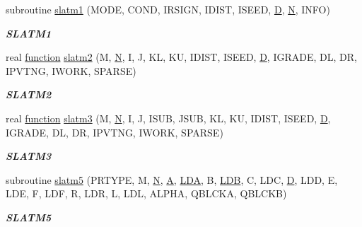 \begin{DoxyCompactItemize}
subroutine \hyperlink{group__real__matgen_ga146096f8dd98f78013e7855671d4dd0d}{slatm1} (M\+O\+D\+E, C\+O\+N\+D, I\+R\+S\+I\+G\+N, I\+D\+I\+S\+T, I\+S\+E\+E\+D, \hyperlink{odrpack_8h_a7dae6ea403d00f3687f24a874e67d139}{D}, \hyperlink{polmisc_8c_a0240ac851181b84ac374872dc5434ee4}{N}, I\+N\+F\+O)
\begin{DoxyCompactList}\small\item\em {\bfseries S\+L\+A\+T\+M1} \end{DoxyCompactList}\item 
real \hyperlink{afunc_8m_a7b5e596df91eadea6c537c0825e894a7}{function} \hyperlink{group__real__matgen_ga75d747ffba3b405bcd93c564ab60d464}{slatm2} (M, \hyperlink{polmisc_8c_a0240ac851181b84ac374872dc5434ee4}{N}, I, J, K\+L, K\+U, I\+D\+I\+S\+T, I\+S\+E\+E\+D, \hyperlink{odrpack_8h_a7dae6ea403d00f3687f24a874e67d139}{D}, I\+G\+R\+A\+D\+E, D\+L, D\+R, I\+P\+V\+T\+N\+G, I\+W\+O\+R\+K, S\+P\+A\+R\+S\+E)
\begin{DoxyCompactList}\small\item\em {\bfseries S\+L\+A\+T\+M2} \end{DoxyCompactList}\item 
real \hyperlink{afunc_8m_a7b5e596df91eadea6c537c0825e894a7}{function} \hyperlink{group__real__matgen_ga11c01010ec97d9562ac0378023086061}{slatm3} (M, \hyperlink{polmisc_8c_a0240ac851181b84ac374872dc5434ee4}{N}, I, J, I\+S\+U\+B, J\+S\+U\+B, K\+L, K\+U, I\+D\+I\+S\+T, I\+S\+E\+E\+D, \hyperlink{odrpack_8h_a7dae6ea403d00f3687f24a874e67d139}{D}, I\+G\+R\+A\+D\+E, D\+L, D\+R, I\+P\+V\+T\+N\+G, I\+W\+O\+R\+K, S\+P\+A\+R\+S\+E)
\begin{DoxyCompactList}\small\item\em {\bfseries S\+L\+A\+T\+M3} \end{DoxyCompactList}\item 
subroutine \hyperlink{group__real__matgen_ga6c74139d5b1727c2b6a4ade4c349bd6b}{slatm5} (P\+R\+T\+Y\+P\+E, M, \hyperlink{polmisc_8c_a0240ac851181b84ac374872dc5434ee4}{N}, \hyperlink{classA}{A}, \hyperlink{example__user_8c_ae946da542ce0db94dced19b2ecefd1aa}{L\+D\+A}, B, \hyperlink{example__user_8c_a50e90a7104df172b5a89a06c47fcca04}{L\+D\+B}, C, L\+D\+C, \hyperlink{odrpack_8h_a7dae6ea403d00f3687f24a874e67d139}{D}, L\+D\+D, E, L\+D\+E, F, L\+D\+F, R, L\+D\+R, L, L\+D\+L, A\+L\+P\+H\+A, Q\+B\+L\+C\+K\+A, Q\+B\+L\+C\+K\+B)
\begin{DoxyCompactList}\small\item\em {\bfseries S\+L\+A\+T\+M5} \end{DoxyCompactList}\item 

\end{DoxyCompactItemize}
